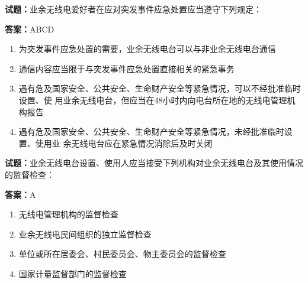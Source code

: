\documentclass{ctexbook}
\begin{document}




\vspace{1em}

\textbf{试题：}业余无线电爱好者在应对突发事件应急处置应当遵守下列规定： 

\textbf{答案：}ABCD 

\begin{enumerate}[leftmargin=3em]
  \item 为突发事件应急处置的需要，业余无线电台可以与非业余无线电台通信 

  \item 通信内容应当限于与突发事件应急处置直接相关的紧急事务 

  \item 遇有危及国家安全、公共安全、生命财产安全等紧急情况，可以不经批准临时设置、使
用业余无线电台，但应当在48小时内向电台所在地的无线电管理机构报告 

  \item 遇有危及国家安全、公共安全、生命财产安全等紧急情况，未经批准临时设置、使用业
余无线电台应在紧急情况消除后及时关闭 

\end{enumerate}





\vspace{1em}

\textbf{试题：}业余无线电台设置、使用人应当接受下列机构对业余无线电台及其使用情况的监督检查： 

\textbf{答案：}A 

\begin{enumerate}[leftmargin=3em]
  \item 无线电管理机构的监督检查 

  \item 业余无线电民间组织的独立监督检查 

  \item 单位或所在居委会、村民委员会、物主委员会的监督检查 

  \item 国家计量监督部门的监督检查 

\end{enumerate}




\end{document}
